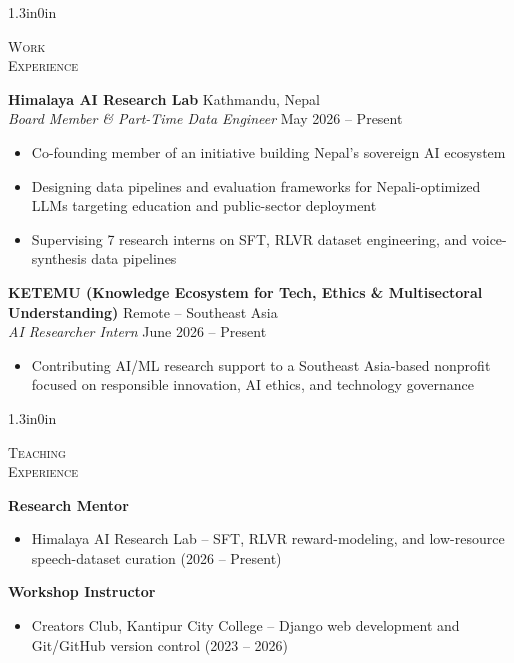 \documentclass[11pt]{article}
\newcommand{\cvlabel}[1]{\hspace*{-1.3in}\parbox[t][\baselineskip][t]{1.05in}{\raggedright\scshape #1\par}\hspace{0.25in}}
\newenvironment{cvsection}[1]{%
  \begin{adjustwidth}{1.3in}{0in}\noindent\cvlabel{#1}%
}{%
  \end{adjustwidth}\vspace{10pt}
}
\begin{document}
\begin{cvsection}{Work\\Experience}
\textbf{Himalaya AI Research Lab} \hfill Kathmandu, Nepal \\
\textit{Board Member \& Part-Time Data Engineer} \hfill May 2026 -- Present
\begin{itemize}
  \item Co-founding member of an initiative building Nepal's sovereign AI ecosystem
  \item Designing data pipelines and evaluation frameworks for Nepali-optimized LLMs targeting education and public-sector deployment
  \item Supervising 7 research interns on SFT, RLVR dataset engineering, and voice-synthesis data pipelines
\end{itemize}

\textbf{KETEMU (Knowledge Ecosystem for Tech, Ethics \& Multisectoral Understanding)} \hfill Remote -- Southeast Asia \\
\textit{AI Researcher Intern} \hfill June 2026 -- Present
\begin{itemize}
  \item Contributing AI/ML research support to a Southeast Asia-based nonprofit focused on responsible innovation, AI ethics, and technology governance
\end{itemize}
\end{cvsection}

\begin{cvsection}{Teaching\\Experience}
\textbf{Research Mentor} \\
\begin{itemize}
  \item Himalaya AI Research Lab -- SFT, RLVR reward-modeling, and low-resource speech-dataset curation (2026 -- Present)
\end{itemize}
\textbf{Workshop Instructor} \\
\begin{itemize}
  \item Creators Club, Kantipur City College -- Django web development and Git/GitHub version control (2023 -- 2026)
\end{itemize}
\end{cvsection}
\end{document}
